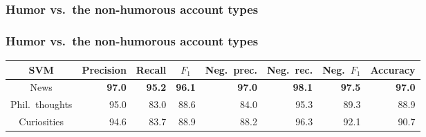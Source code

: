 \subsubsection{Humor vs.\ the non-humorous account types}
\begin{frame}
    \frametitle{Humor vs.\ the non-humorous account types}

    \begin{center}
        \scriptsize
        \begin{tabular}{ c r r r r r r r }
            \textbf{SVM} & \multicolumn{1}{c}{Precision} & \multicolumn{1}{c}{Recall} & \multicolumn{1}{c}{$F_1$} & \multicolumn{1}{c}{Neg.\ prec.} & \multicolumn{1}{c}{Neg.\ rec.} & \multicolumn{1}{c}{Neg.\ $F_1$} & \multicolumn{1}{c}{Accuracy} \\
            \midrule
            News & \textbf{97.0} & \textbf{95.2} & \textbf{96.1} & \textbf{97.0} & \textbf{98.1} & \textbf{97.5} & \textbf{97.0} \\
            \midrule
            Phil.\ thoughts & 95.0 & 83.0 & 88.6 & 84.0 & 95.3 & 89.3 & 88.9 \\
            \midrule
            Curiosities & 94.6 & 83.7 & 88.9 & 88.2 & 96.3 & 92.1 & 90.7 \\
        \end{tabular}
    \end{center}
\end{frame}
